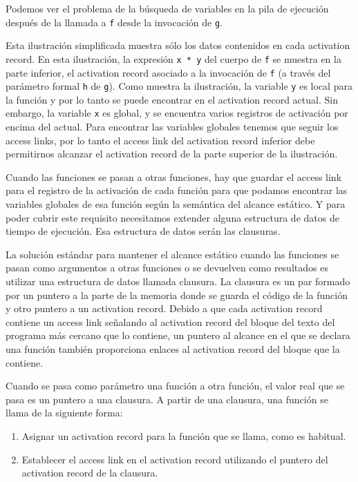 \documentclass[10pt,a4paper]{report}
\begin{document}
Podemos ver el problema de la búsqueda de variables en la pila de
ejecución después de la llamada a \verb|f| desde la invocación de
\verb|g|.

\begin{center}

\end{center}

Esta ilustración simplificada muestra sólo los datos contenidos en
cada activation record. En esta ilustración, la expresión \verb|x * y|
del cuerpo de \verb|f| se muestra en la parte inferior, el activation
record asociado a la invocación de \verb|f| (a través del parámetro
formal \verb|h| de \verb|g|). Como muestra la ilustración, la variable
\verb|y| es local para la función y por lo tanto se puede encontrar en
el activation record actual. Sin embargo, la variable \verb|x| es
global, y se encuentra varios registros de activación por encima del
actual. Para encontrar las variables globales tenemos que seguir los
access links, por lo tanto el access link del activation record
inferior debe permitirnos alcanzar el activation record de la parte
superior de la ilustración.

Cuando las funciones se pasan a otras funciones, hay que guardar el
access link para el registro de la activación de cada función para que
podamos encontrar las variables globales de esa función según la
semántica del alcance estático. Y para poder cubrir este requisito
necesitamos extender alguna estructura de datos de tiempo de
ejecución. Esa estructura de datos serán las clausuras.

La solución estándar para mantener el alcance estático cuando las
funciones se pasan como argumentos a otras funciones o se devuelven
como resultados es utilizar una estructura de datos llamada
clausura. La clausura es un par formado por un puntero a la
parte de la memoria donde se guarda el código de la función y otro
puntero a un activation record. Debido a que cada activation record
contiene un access link señalando al activation record del bloque del
texto del programa más cercano que lo contiene, un puntero al alcance
en el que se declara una función también proporciona enlaces al
activation record del bloque que la contiene.

Cuando se pasa como parámetro una función a otra función, el valor
real que se pasa es un puntero a una clausura. A partir de una
clausura, una función se llama de la siguiente forma:

\begin{enumerate}
\item Asignar un activation record para la función que se llama, como
  es habitual.
\item Establecer el access link en el activation record utilizando el
  puntero del activation record de la clausura.
\end{enumerate}
\end{document}

